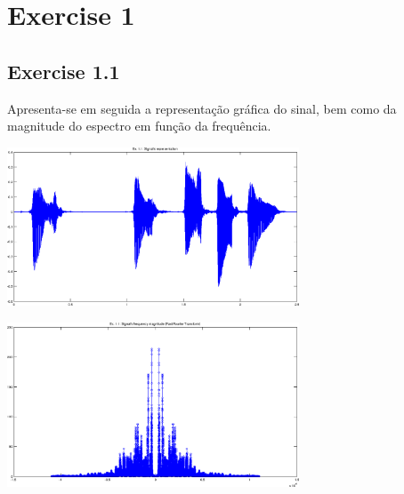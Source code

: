 \documentclass[a4paper]{article}
\title{\documentTitle}
\author{\documentAuthors}
\begin{document}
\maketitle
\cleardoublepage

\tableofcontents
\cleardoublepage

\setlength{\parindent}{1cm}
\setlength{\parskip}{0.3cm}

\section{Exercise 1}
\subsection{Exercise 1.1}
\indent \indent Apresenta-se em seguida a representação gráfica do sinal, bem como da magnitude do espectro em função da frequência.
\begin{center}
	\includegraphics[width=0.65\textwidth]{images/ex_1_1_sign.png}
\end{center}

\begin{center}
	\includegraphics[width=0.65\textwidth]{images/ex_1_1_mag.png}
\end{center}

\clearpage
\end{document}
